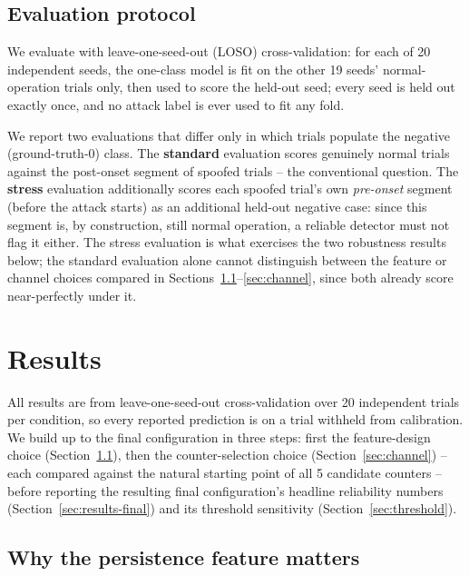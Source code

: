 \documentclass[conference]{IEEEtran}
\begin{document}
\subsection{Evaluation protocol}
\label{sec:protocol}

We evaluate with leave-one-seed-out (LOSO) cross-validation: for each of 20 independent seeds, the one-class model is fit on the other 19 seeds' normal-operation trials only, then used to score the held-out seed; every seed is held out exactly once, and no attack label is ever used to fit any fold.

We report two evaluations that differ only in which trials populate the negative (ground-truth-0) class. The \textbf{standard} evaluation scores genuinely normal trials against the post-onset segment of spoofed trials -- the conventional question. The \textbf{stress} evaluation additionally scores each spoofed trial's own \emph{pre-onset} segment (before the attack starts) as an additional held-out negative case: since this segment is, by construction, still normal operation, a reliable detector must not flag it either. The stress evaluation is what exercises the two robustness results below; the standard evaluation alone cannot distinguish between the feature or channel choices compared in Sections~\ref{sec:results-persistence}--\ref{sec:channel}, since both already score near-perfectly under it.

\section{Results}

All results are from leave-one-seed-out cross-validation over 20 independent trials per condition, so every reported prediction is on a trial withheld from calibration. We build up to the final configuration in three steps: first the feature-design choice (Section~\ref{sec:results-persistence}), then the counter-selection choice (Section~\ref{sec:channel}) -- each compared against the natural starting point of all 5 candidate counters -- before reporting the resulting final configuration's headline reliability numbers (Section~\ref{sec:results-final}) and its threshold sensitivity (Section~\ref{sec:threshold}).

\subsection{Why the persistence feature matters}
\label{sec:results-persistence}
\end{document}
